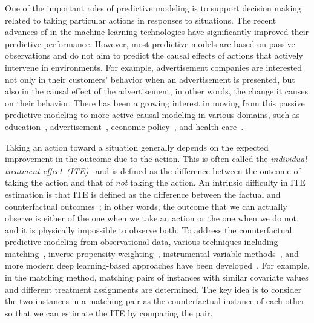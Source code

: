 One of the important roles of predictive modeling is to support decision making related to taking particular actions in responses to situations.
The recent advances of in the machine learning technologies have significantly improved their predictive performance.
However, most predictive models are based on passive observations and do not aim to predict the  causal effects of actions that actively intervene in environments.
%
For example, advertisement companies are interested not only in their customers' behavior when an advertisement is presented, but also in the causal effect of the advertisement, in other words, the change it causes on their behavior.
%
There has been a growing interest in moving from this passive predictive modeling to more active causal modeling in various domains, such as education~\cite{hill2011bayesian}, advertisement~\cite{chan2010evaluating,li2016matching}, 
economic policy~\cite{lalonde1986evaluating},
and health care~\cite{glass2013causal}.

Taking an action toward a situation generally depends on the expected improvement in the outcome due to the action.
This is often called the {\it individual treatment effect~(ITE)}~\cite{rubin1974estimating} and is defined as the difference between the outcome of taking the action and that of {\it not} taking the action.
%
An intrinsic difficulty in ITE estimation is that ITE is defined as the difference between the factual and counterfactual outcomes~\cite{lewis1974causation,pearl2009causality,rubin1974estimating}; in other words, the outcome that we can actually observe is either of the one when we take an action or the one when we do not, and it is physically impossible to observe both.
%
To address the counterfactual predictive modeling from observational data, various techniques including matching~\cite{rubin1973matching}, inverse-propensity weighting~\cite{rosenbaum1983central}, instrumental variable methods~\cite{baiocchi2014instrumental}, and more modern deep learning-based approaches have been developed~\cite{shalit2017estimating,johansson2016learning}.
For example, in the matching method, matching pairs of instances with similar covariate values and different treatment assignments are determined.
The key idea is to consider the two instances in a matching pair as the counterfactual instance of each other so that we can estimate the ITE by comparing the pair.


